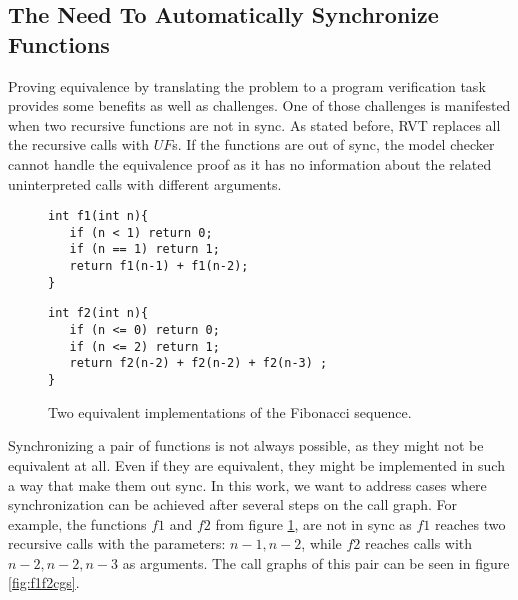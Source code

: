 \subsection{The Need To Automatically Synchronize Functions}
Proving equivalence by translating the problem to a program verification task provides some benefits as well as challenges. One of those challenges is manifested when two recursive functions are not in sync. As stated before, RVT replaces all the recursive calls with $UF$s. If the functions are out of sync, the model checker cannot handle the equivalence proof as it has no information about the related uninterpreted calls with different arguments.
\begin{figure}[h]
\begin{center}
\begin{minipage}{7 cm}
\begin{lstlisting}
int f1(int n){
   if (n < 1) return 0;
   if (n == 1) return 1; 
   return f1(n-1) + f1(n-2);
}
\end{lstlisting}
\end{minipage}
\begin{minipage}{7 cm}
\begin{lstlisting}
int f2(int n){
   if (n <= 0) return 0;
   if (n <= 2) return 1;
   return f2(n-2) + f2(n-2) + f2(n-3) ;
}
\end{lstlisting}
\end{minipage}
\caption{Two equivalent implementations of the Fibonacci sequence.}
\label{fig:f1f2}
\end{center}
\end{figure}
Synchronizing a pair of functions is not always possible, as they might not be equivalent at all. Even if they are equivalent, they might be implemented in such a way that make them out sync. In this work, we want to address cases where synchronization can be achieved after several steps on the call graph. For example, the functions $f1$ and $f2$ from figure \ref{fig:f1f2}, are not in sync as $f1$ reaches two recursive calls with the parameters: $n-1,n-2$, while $f2$ reaches calls with $n-2,n-2,n-3$ as arguments. The call graphs of this pair can be seen in figure \ref{fig:f1f2cgs}.

